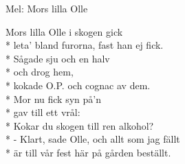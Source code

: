 \begin{SongText}[Skogskokarvisa]
    \begin{SongInfo}
        Mel: Mors lilla Olle
    \end{SongInfo}
    \begin{SongVerse}
        Mors lilla Olle i skogen gick\\*%
        leta’ bland furorna, fast han ej fick.\\*%
        Sågade sju och en halv\\*%
        och drog hem,\\*%
        kokade O.P. och cognac av dem.\\*%
        Mor nu fick syn på’n\\*%
        gav till ett vrål:\\*%
        Kokar du skogen till ren alkohol?\\*%
        - Klart, sade Olle, och allt som jag fällt\\*%
        är till vår fest här på gården beställt.
    \end{SongVerse}
\end{SongText}
